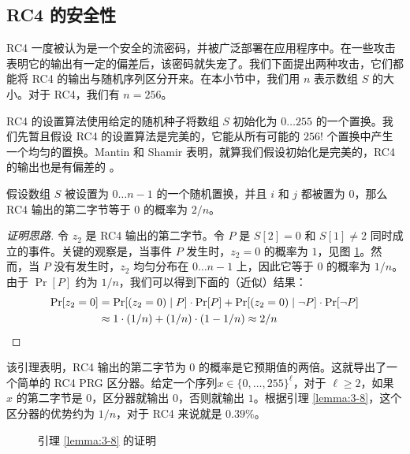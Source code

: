 \subsection{RC4 的安全性}\label{subsec:3-9-1}


RC4 一度被认为是一个安全的流密码，并被广泛部署在应用程序中。在一些攻击表明它的输出有一定的偏差后，该密码就失宠了。我们下面提出两种攻击，它们都能将 RC4 的输出与随机序列区分开来。在本小节中，我们用 $n$ 表示数组 $S$ 的大小。对于 RC4，我们有 $n=256$。

\begin{snote}[初始 RC4 输出中的偏差。]
RC4 的设置算法使用给定的随机种子将数组 $S$ 初始化为 $0 \dots 255$ 的一个置换。我们先暂且假设 RC4 的设置算法是完美的，它能从所有可能的 $256!$ 个置换中产生一个均匀的置换。Mantin 和 Shamir 表明，就算我们假设初始化是完美的，RC4 的输出也是有偏差的 \cite{mantin2001practical}。
\end{snote}

\begin{lemma}\label{lemma:3-8}
假设数组 $S$ 被设置为 $0\dots n-1$ 的一个随机置换，并且 $i$ 和 $j$ 都被置为 $0$，那么 RC4 输出的第二字节等于 $0$ 的概率为 $2/n$。
\end{lemma}

\begin{proof}[证明思路]
令 $z_2$ 是 RC4 输出的第二字节。令 $P$ 是 $S[2]=0$ 和 $S[1]\neq2$ 同时成立的事件。关键的观察是，当事件 $P$ 发生时，$z_2=0$ 的概率为 $1$，见图 \ref{fig:3-13}。然而，当 $P$ 没有发生时，$z_2$ 均匀分布在 $0\dots n-1$ 上，因此它等于 $0$ 的概率为 $1/n$。由于 $\Pr[P]$ 约为 $1/n$，我们可以得到下面的（近似）结果：
\[
\begin{aligned}
\Pr[z_2=0]
& =\Pr[(z_2=0)\;|\;P]\cdot\Pr[P]+\Pr[(z_2=0)\;|\;\lnot P]\cdot\Pr[\lnot P]\\
& \approx 1\cdot(1/n)+(1/n)\cdot(1-1/n)
\approx 2/n
\qedhere
\end{aligned}
\]
\end{proof}

该引理表明，RC4 输出的第二字节为 $0$ 的概率是它预期值的两倍。这就导出了一个简单的 RC4 PRG 区分器。给定一个序列$x\in\{0,\dots,255\}^\ell$，对于 $\ell\geq2$，如果 $x$ 的第二字节是 $0$，区分器就输出 $0$，否则就输出 $1$。根据引理 \ref{lemma:3-8}，这个区分器的优势约为 $1/n$，对于 RC4 来说就是 $0.39\%$。

\begin{figure}
	\centering
	
	\caption{引理 \ref{lemma:3-8} 的证明}
	\label{fig:3-13}
\end{figure}

